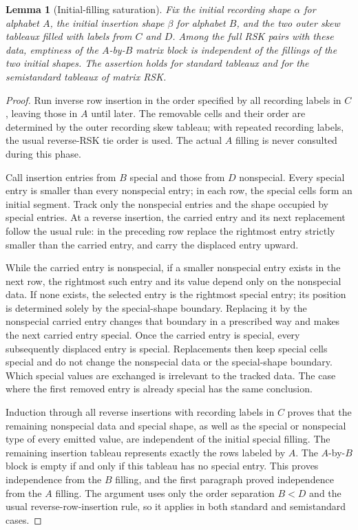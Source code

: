 \documentclass[11pt,letterpaper]{article}
\newtheorem{lemma}[theorem]{Lemma}
\theoremstyle{remark}\newtheorem{remark}[theorem]{Remark}
\numberwithin{equation}{section}
\begin{document}
\begin{lemma}[Initial-filling saturation]\label{upo:ex5:lem:saturation}
Fix the initial recording shape $\alpha$ for alphabet $A$, the
initial insertion shape $\beta$ for alphabet $B$, and the two outer
skew tableaux filled with labels from $C$ and $D$. Among the full RSK
pairs with these data, emptiness of the $A$-by-$B$ matrix block is
independent of the fillings of the two initial shapes. The assertion
holds for standard tableaux and for the semistandard tableaux of
matrix RSK.
\end{lemma}
\begin{proof}
Run inverse row insertion in the order specified by all recording
labels in $C$, leaving those in $A$ until later. The removable cells
and their order are determined by the outer recording skew tableau;
with repeated recording labels, the usual reverse-RSK tie order is
used. The actual $A$ filling is never consulted during this phase.

Call insertion entries from $B$ special and those from $D$
nonspecial. Every special entry is smaller than every nonspecial
entry; in each row, the special cells form an initial segment.
Track only the nonspecial entries and the shape occupied by special
entries. At a reverse insertion, the carried entry and its next
replacement follow the usual rule: in the preceding row replace the
rightmost entry strictly smaller than the carried entry, and carry
the displaced entry upward.

While the carried entry is nonspecial, if a smaller nonspecial entry
exists in the next row, the rightmost such entry and its value depend
only on the nonspecial data. If none exists, the selected entry is
the rightmost special entry; its position is determined solely by
the special-shape boundary. Replacing it by the nonspecial carried
entry changes that boundary in a prescribed way and makes the next
carried entry special. Once the carried entry is special, every
subsequently displaced entry is special. Replacements then keep
special cells special and do not change the nonspecial data or the
special-shape boundary. Which special values are exchanged is
irrelevant to the tracked data. The case where the first removed
entry is already special has the same conclusion.

Induction through all reverse insertions with recording labels in
$C$ proves that the remaining nonspecial data and special shape,
as well as the special or nonspecial type of every emitted value,
are independent of the initial special filling. The remaining
insertion tableau represents exactly the rows labeled by $A$.
The $A$-by-$B$ block is empty if and only if this tableau has no
special entry. This proves independence from the $B$ filling, and
the first paragraph proved independence from the $A$ filling.
The argument uses only the order separation $B<D$ and the usual
reverse-row-insertion rule, so it applies in both standard and
semistandard cases.
\end{proof}
\end{document}
